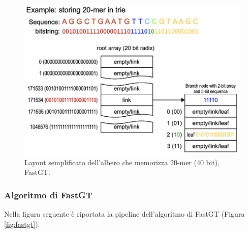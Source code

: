 \documentclass[../main.tex]{subfiles}
\begin{document}
\begin{figure}[h!]
	\centering
  	\captionsetup{justification=centering}
  	\includegraphics[scale=.35]{images/fastgt-art.png}
  	\caption{Layout semplificato dell'albero che memorizza 20-mer (40 bit), FastGT.}
  	\label{fig:art}
\end{figure}


\subsubsection{Algoritmo di FastGT}

Nella figura seguente è riportata la pipeline dell'algoritmo di FastGT (Figura \ref{fig:fastgt}).
\end{document}
